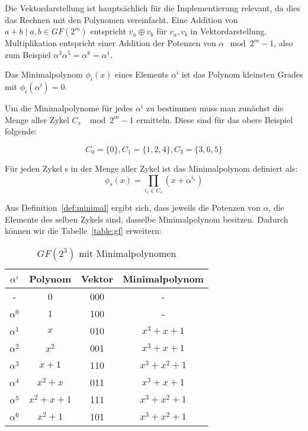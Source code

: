 Die Vektordarstellung ist hauptsächlich für die Implementierung relevant, da dies das Rechnen mit den Polynomen vereinfacht. Eine Addition von $a+b \mid a,b \in GF(2^m)$ entspricht $v_a \oplus v_b$ für $v_a,v_b$ in Vektordarstellung. Multiplikation entspricht einer Addition der Potenzen von $\alpha \mod 2^m-1$, also zum Beispiel $\alpha^3\alpha^5 = \alpha^8 = \alpha^1$.\cite[S. 49]{morelos2006art}

\begin{t_def}
Das Minimalpolynom $\phi_i(x)$ eines Elements $\alpha^i$ ist das Polynom kleinsten Grades mit $\phi_i(\alpha^i) = 0$.\cite[S. 50]{morelos2006art}
\end{t_def}

Um die Minimalpolynome für jedes $\alpha^i$ zu bestimmen muss man zunächst die Menge aller Zykel $C_s$ $\mod 2^m-1$ ermitteln. Diese sind für das obere Beispiel folgende:

\begin{center}
$$C_0 = \{0\}, C_1 = \{1,2,4\}, C_3 = \{3,6,5\}$$
\end{center}

\begin{t_def}
\label{def:minimal}
Für jeden Zykel s in der Menge aller Zykel ist das Minimalpolynom definiert als: $$\phi_s(x) = \prod_{i_s \in C_s}(x+\alpha^{i_s})$$\cite[S. 51]{morelos2006art}
\end{t_def}

Aus Definition~\ref{def:minimal} ergibt sich, dass jeweils die Potenzen von $\alpha$, die Elemente des selben Zykels sind, dasselbe Minimalpolynom besitzen. Dadurch können wir die Tabelle~\ref{table:gf} erweitern:

\begin{table}[!h]
\begin{center}
\begin{tabular}{c|c|c|c}
$\alpha^i$ & Polynom & Vektor & Minimalpolynom\\
\hline
- & 0 & 000 & - \\
$\alpha^0$ & $1$ & 100 & - \\
$\alpha^1$ & $x$ & 010 & $x^3+x+1$ \\
$\alpha^2$ & $x^2$ & 001  & $x^3+x+1$ \\
$\alpha^3$ & $x+1$ & 110  & $x^3+x^2+1$ \\
$\alpha^4$ & $x^2+x$ & 011  & $x^3+x+1$ \\
$\alpha^5$ & $x^2+x+1$ & 111  & $x^3+x^2+1$ \\
$\alpha^6$ & $x^2+1$ & 101  & $x^3+x^2+1$  \\
\end{tabular}
\caption{$GF(2^3)$ mit Minimalpolynomen}
\label{table:minimals}
\end{center}
\end{table}

